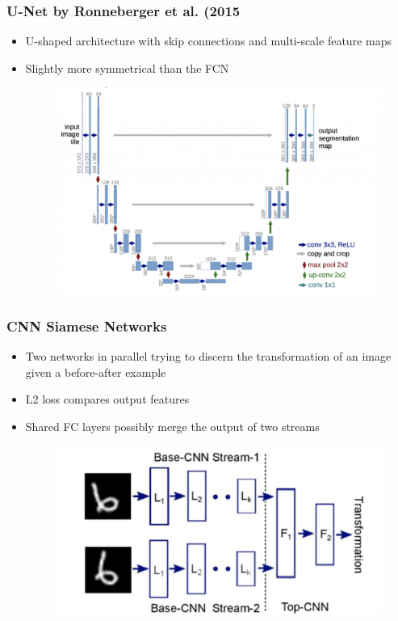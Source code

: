 \subsubsection{U-Net by Ronneberger et al. (2015}
\begin{itemize}
    \item U-shaped architecture with skip connections and multi-scale feature maps
    \item Slightly more symmetrical than the FCN
    \begin{figure}[H]
        \centering
        \includegraphics[width=0.5\linewidth]{img/u_net.png}
        
        
    \end{figure}
\end{itemize}

\subsubsection{CNN Siamese Networks}
\begin{itemize}
    \item Two networks in parallel trying to discern the transformation of an image given a before-after example
    \item L2 loss compares output features
    \item Shared FC layers possibly merge the output of two streams
    \begin{figure}[H]
        \centering
        \includegraphics[width=0.75\linewidth]{img/siamese.png}
        
        
    \end{figure}
\end{itemize}

